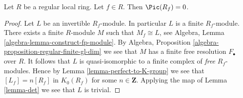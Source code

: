 \begin{lemma}
\label{lemma-regular-local-Pic-zero}
Let $R$ be a regular local ring. Let $f \in R$.
Then $\Pic(R_f) = 0$.
\end{lemma}

\begin{proof}
Let $L$ be an invertible $R_f$-module. In particular $L$ is
a finite $R_f$-module. There exists a finite $R$-module
$M$ such that $M_f \cong L$, see
Algebra, Lemma \ref{algebra-lemma-construct-fp-module}.
By Algebra, Proposition \ref{algebra-proposition-regular-finite-gl-dim}
we see that $M$ has a finite free resolution $F_\bullet$ over $R$.
It follows that $L$ is quasi-isomorphic to a finite complex
of {\it free} $R_f$-modules. Hence by
Lemma \ref{lemma-perfect-to-K-group} we see that
$[L_f] = n[R_f]$ in $K_0(R_f)$ for some $n \in \mathbf{Z}$.
Applying the map of Lemma \ref{lemma-det}
we see that $L$ is trivial.
\end{proof}
